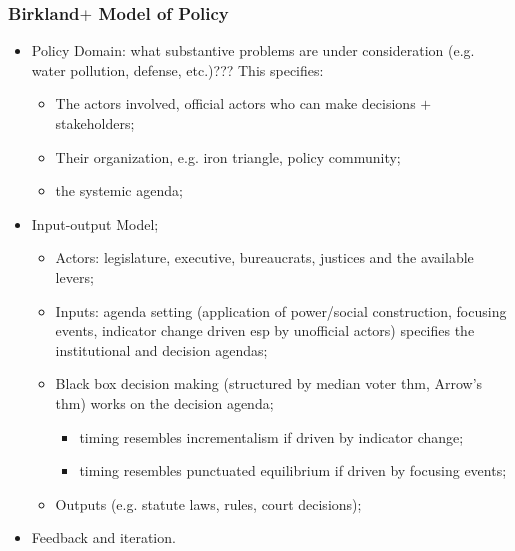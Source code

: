 \documentclass[aspectratio=169]{beamer}
\theoremstyle{principle}
\begin{document}
\begin{frame}
\frametitle{Birkland$+$ Model of Policy}
\begin{itemize}
\item Policy Domain: what substantive problems are under consideration (e.g. water pollution, defense, etc.)???  This specifies:
\begin{itemize}
\item The actors involved, official actors who can make decisions $+$ stakeholders; 
\item Their organization, e.g. iron triangle, policy community;
\item the systemic agenda; 
\end{itemize}
\bigskip
\item \color{black}Input-output Model;
\begin{itemize}
\item Actors: legislature, executive, bureaucrats, justices and the available levers;
\item Inputs: agenda setting (application of power/social construction, focusing events, indicator change driven esp by unofficial actors) specifies the institutional and decision agendas;
\item Black box decision making (structured by median voter thm, Arrow's thm) works on the decision agenda;
\begin{itemize}
\item timing resembles incrementalism if driven by indicator change;
\item timing resembles punctuated equilibrium if driven by focusing events;
 \end{itemize}
\item Outputs (e.g. statute laws, rules, court decisions);
\end{itemize}
\bigskip
\item Feedback and iteration.
\end{itemize}
\end{frame}
\end{document}
